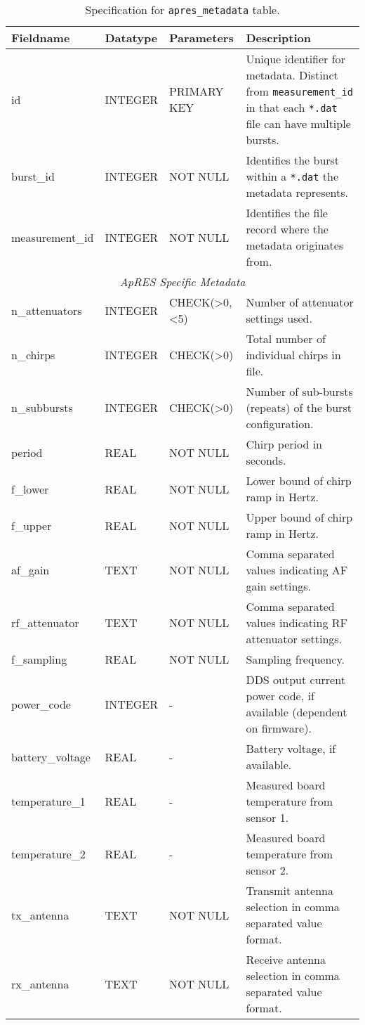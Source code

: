 \documentclass[a4paper]{article}
\newcommand{\sqlspectable}[2]{
    \begin{table}[h!]
        \centering
        \renewcommand{\arraystretch}{1.5}
        \rowcolors{2}{gray!10}{white}
        \begin{tabular}{l l p{3cm} >{\raggedright\arraybackslash}p{4cm}}
            \hline
            \textbf{Fieldname} & \textbf{Datatype} & \textbf{Parameters} & \textbf{Description}\\
            \hline
            #1
            \hline
        \end{tabular}
        \caption{#2}
    \end{table}
}
\begin{document}
    \sqlspectable{
        id & INTEGER & PRIMARY KEY & 
        Unique identifier for metadata.  Distinct from \texttt{measurement\_id}
        in that each \texttt{*.dat} file can have multiple bursts.\\
        burst\_id & INTEGER & NOT NULL &
        Identifies the burst within a \texttt{*.dat} the metadata represents.\\
        measurement\_id & INTEGER & NOT NULL & 
        Identifies the file record where the metadata originates from. \\
        \hline
        \multicolumn{4}{c}{\textit{ApRES Specific Metadata}} \\
        \hline
        n\_attenuators & INTEGER & CHECK(\textgreater 0, \textless 5) & 
        Number of attenuator settings used. \\
        n\_chirps & INTEGER & CHECK(\textgreater 0) & 
        Total number of individual chirps in file. \\
        n\_subbursts & INTEGER & CHECK(\textgreater 0) &
        Number of sub-bursts (repeats) of the burst configuration. \\
        period & REAL & NOT NULL & 
        Chirp period in seconds. \\
        f\_lower & REAL & NOT NULL &
        Lower bound of chirp ramp in Hertz. \\
        f\_upper & REAL & NOT NULL & 
        Upper bound of chirp ramp in Hertz. \\
        af\_gain & TEXT & NOT NULL &
        Comma separated values indicating AF gain settings. \\
        rf\_attenuator & TEXT & NOT NULL & 
        Comma separated values indicating RF attenuator settings. \\
        f\_sampling & REAL & NOT NULL & 
        Sampling frequency. \\
        power\_code & INTEGER & - &
        DDS output current power code, if available (dependent on firmware).\\
        battery\_voltage & REAL & - &
        Battery voltage, if available. \\
        temperature\_1 & REAL & - &
        Measured board temperature from sensor 1. \\
        temperature\_2 & REAL & - & 
        Measured board temperature from sensor 2. \\
        tx\_antenna & TEXT & NOT NULL &
        Transmit antenna selection in comma separated value format. \\
        rx\_antenna & TEXT & NOT NULL &
        Receive antenna selection in comma separated value format. \\

    }{
        Specification for \texttt{apres\_metadata} table.
    }
    
\end{document}
